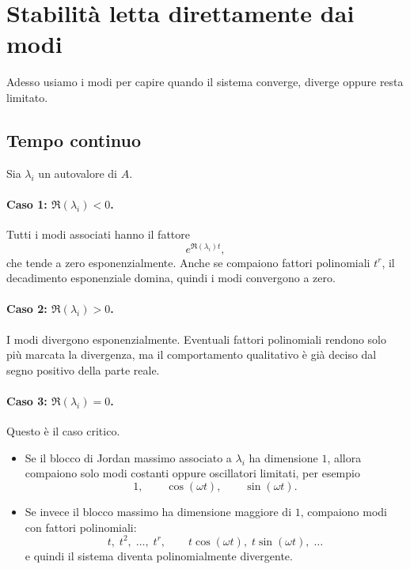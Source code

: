 \section{Stabilità letta direttamente dai modi}

Adesso usiamo i modi per capire quando il sistema converge, diverge oppure resta limitato.

\subsection{Tempo continuo}

Sia $\lambda_i$ un autovalore di $A$.

\paragraph{Caso 1: \texorpdfstring{$\Re(\lambda_i)<0$}{Re(lambda)<0}.}
Tutti i modi associati hanno il fattore
\[
e^{\Re(\lambda_i)t},
\]
che tende a zero esponenzialmente. Anche se compaiono fattori polinomiali $t^r$, il decadimento esponenziale domina, quindi i modi convergono a zero.

\paragraph{Caso 2: \texorpdfstring{$\Re(\lambda_i)>0$}{Re(lambda)>0}.}
I modi divergono esponenzialmente. Eventuali fattori polinomiali rendono solo più marcata la divergenza, ma il comportamento qualitativo è già deciso dal segno positivo della parte reale.

\paragraph{Caso 3: \texorpdfstring{$\Re(\lambda_i)=0$}{Re(lambda)=0}.}
Questo è il caso critico.

\begin{itemize}
    \item Se il blocco di Jordan massimo associato a $\lambda_i$ ha dimensione $1$, allora compaiono solo modi costanti oppure oscillatori limitati, per esempio
    \[
    1,\qquad \cos(\omega t),\qquad \sin(\omega t).
    \]
    \item Se invece il blocco massimo ha dimensione maggiore di $1$, compaiono modi con fattori polinomiali:
    \[
    t,\; t^2,\; \dots,\; t^r,
    \qquad
    t\cos(\omega t),\; t\sin(\omega t),\; \dots
    \]
    e quindi il sistema diventa polinomialmente divergente.
\end{itemize}

